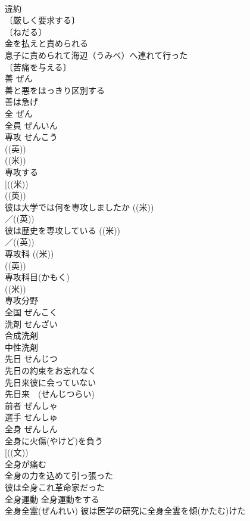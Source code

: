 \documentclass[8pt]{extreport}
\begin{document}
\begin{CJK}{UTF8}{min}
\\	違約　 
\\	〔厳しく要求する〕
\\	〔ねだる〕
\\	金を払えと責められる 
\\	息子に責められて海辺（うみべ）へ連れて行った 
\\	〔苦痛を与える〕
\\	善	ぜん	
\\	善と悪をはっきり区別する 
\\	善は急げ 
\\	全	ぜん	
\\	全員	ぜんいん	
\\	専攻	せんこう	
\\	((英))
\\	((米))
\\	専攻する 
\\	[((米)) 
\\	((英)) 
\\	彼は大学では何を専攻しましたか ((米)) 
\\	／((英)) 
\\	彼は歴史を専攻している ((米)) 
\\	／((英)) 
\\	専攻科 ((米)) 
\\	((英)) 
\\	専攻科目(かもく) 
\\	((米))
\\	専攻分野 
\\	全国	ぜんこく	
\\	洗剤	せんざい	
\\	合成洗剤 
\\	中性洗剤 
\\	先日	せんじつ	
\\	先日の約束をお忘れなく 
\\	先日来彼に会っていない 
\\	先日来　(せんじつらい) 
\\	前者	ぜんしゃ	
\\	選手	せんしゅ	
\\	全身	ぜんしん	
\\	全身に火傷(やけど)を負う 
\\	[((文)) 
\\	全身が痛む 
\\	全身の力を込めて引っ張った 
\\	彼は全身これ革命家だった 
\\	全身運動 全身運動をする 
\\	全身全霊(ぜんれい) 彼は医学の研究に全身全霊を傾(かたむ)けた 

\end{CJK}
\end{document}

